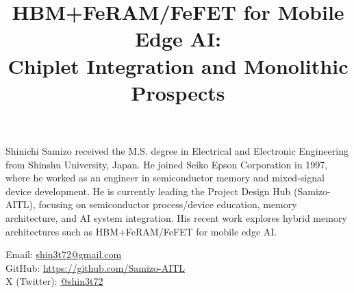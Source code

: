 \documentclass[10pt,conference]{IEEEtran}
\title{HBM+FeRAM/FeFET for Mobile Edge AI:\\
Chiplet Integration and Monolithic Prospects}
\author{
  \IEEEauthorblockN{Shinichi Samizo}
  \IEEEauthorblockA{Project Design Hub (Samizo-AITL), Japan\\
  Email: \href{mailto:shin3t72@gmail.com}{shin3t72@gmail.com}}
}
\begin{document}
\maketitle










\begin{IEEEbiography}[]{Shinichi Samizo}
received the M.S. degree in Electrical and Electronic Engineering from Shinshu University, Japan.  
He joined Seiko Epson Corporation in 1997, where he worked as an engineer in semiconductor memory and mixed-signal device development.  
He is currently leading the Project Design Hub (Samizo-AITL), focusing on semiconductor process/device education, memory architecture, and AI system integration.  
His recent work explores hybrid memory architectures such as HBM+FeRAM/FeFET for mobile edge AI.  

Email: \href{mailto:shin3t72@gmail.com}{shin3t72@gmail.com} \\
GitHub: \href{https://github.com/Samizo-AITL}{https://github.com/Samizo-AITL} \\
X (Twitter): \href{https://x.com/shin3t72}{@shin3t72}
\end{IEEEbiography}
\end{document}
